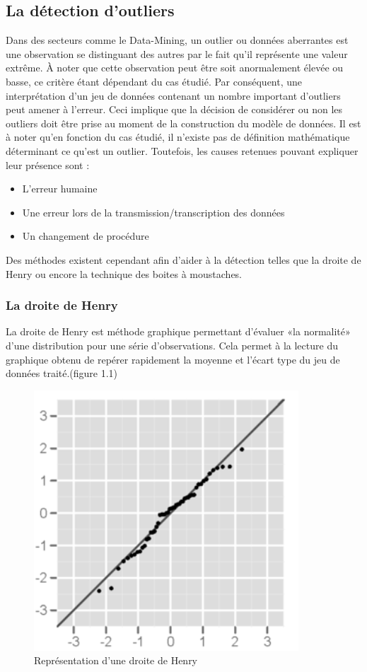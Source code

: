\documentclass[memoire.tex]{subfiles}
\begin{document}
\subsection{La détection d'outliers}
Dans des secteurs comme le Data-Mining, un outlier ou données aberrantes est une observation se distinguant des autres par le fait qu'il représente une valeur extrême. À noter que cette observation peut être soit anormalement élevée ou basse, ce critère étant dépendant du cas étudié. Par conséquent, une interprétation d'un jeu de données contenant un nombre important d'outliers peut amener à l'erreur. Ceci implique que la décision de considérer ou non les outliers doit être prise au moment de la construction du modèle de données. Il est à noter qu'en fonction du cas étudié, il n'existe pas de définition mathématique déterminant ce qu'est un outlier. Toutefois, les causes retenues pouvant expliquer leur présence sont : \begin{itemize}
\item L'erreur humaine
\item Une erreur lors de la transmission/transcription des données
\item Un changement de procédure
\end{itemize}
Des méthodes existent cependant afin d'aider à la détection telles que la  droite de Henry ou encore la technique des boites à moustaches.
\subsubsection{La droite de Henry}
La droite de Henry est méthode graphique permettant d'évaluer «la normalité» d'une distribution pour une série d'observations. Cela permet à la lecture du graphique obtenu de repérer rapidement la moyenne et l'écart type du jeu de données traité.(figure 1.1)
	\begin{figure}[h!]
		\centerline{\includegraphics[scale=0.8]{img/henry.png}}
		\caption{Représentation d'une droite de Henry}
	\end{figure}
\end{document}
